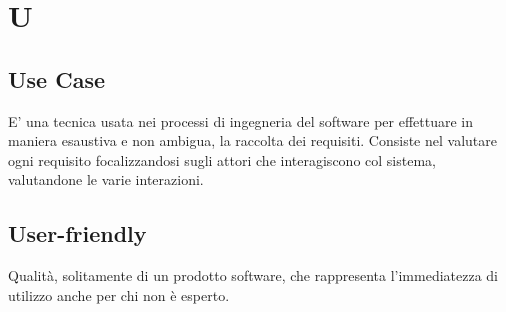 \section*{U}

\subsection{Use Case} 
E' una tecnica usata nei processi di ingegneria del software per effettuare in maniera esaustiva e non ambigua, la raccolta dei requisiti. Consiste nel valutare ogni requisito focalizzandosi sugli attori che interagiscono col sistema, valutandone le varie interazioni.

\subsection{User-friendly} 
Qualità, solitamente di un prodotto software, che rappresenta l'immediatezza di utilizzo anche per chi non è esperto.

